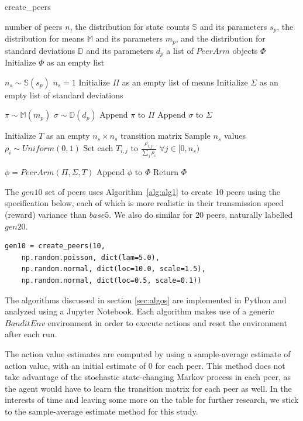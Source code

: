 \documentclass{article}
\begin{document}
\begin{algorithm}[tb]
    \caption{create\_peers}
    \label{alg:alg1}
\begin{algorithmic}
     number of peers $n$, the distribution for state counts $\mathbb{S}$ and its parameters $s_p$, the distribution for means $\mathbb{M}$ and 
    its parameters $m_p$, and the distribution for standard deviations $\mathbb{D}$ and its parameters $d_p$
     a list of $PeerArm$ objects $\Phi$
    \STATE Initialize $\Phi$ as an empty list
    
    \STATE $n_s \sim \mathbb{S}(s_p)$
    \STATE $n_s = 1$
    \ENDIF
    \STATE Initialize $\Pi$ as an empty list of means
    \STATE Initialize $\Sigma$ as an empty list of standard deviations

    \STATE $\pi \sim \mathbb{M}(m_p)$
    \STATE $\sigma \sim \mathbb{D}(d_p)$
    \STATE Append $\pi$ to $\Pi$
    \STATE Append $\sigma$ to $\Sigma$
    \ENDFOR

    \STATE Initialize $T$ as an empty $n_s \times n_s$ transition matrix
    \STATE Sample $n_s$ values $\rho_i \sim Uniform(0, 1)$
    \STATE Set each $T_{i,j}$ to $\frac{\rho_{i,j}}{\sum_j\rho_i}$ $\forall j \in [0, n_s)$
    \ENDFOR

    \STATE $\phi = PeerArm(\Pi, \Sigma, T)$
    \STATE Append $\phi$ to $\Phi$
    \ENDFOR
    \STATE Return $\Phi$
\end{algorithmic}
\end{algorithm}

The $gen10$ set of peers uses Algorithm~\ref{alg:alg1} to create 10 peers using the specification below, each of which is more realistic in their transmission 
speed (reward) variance than $base5$. We also do similar for 20 peers, naturally labelled $gen20$.
\begin{lstlisting}
gen10 = create_peers(10, 
    np.random.poisson, dict(lam=5.0), 
    np.random.normal, dict(loc=10.0, scale=1.5), 
    np.random.normal, dict(loc=0.5, scale=0.1))
\end{lstlisting}

The algorithms discussed in section \ref{sec:algos} are implemented in Python and analyzed using a Jupyter Notebook. Each algorithm makes use of a generic $BanditEnv$ 
environment in order to execute actions and reset the environment after each run. 

The action value estimates are computed by using a sample-average estimate of action value, with an initial estimate of 0 for each peer. This method does not take 
advantage of the stochastic state-changing Markov process in each peer, as the agent would have to learn the transition matrix for each peer as well. In the interests of 
time and leaving some more on the table for further research, we stick to the sample-average estimate method for this study.
\end{document}
